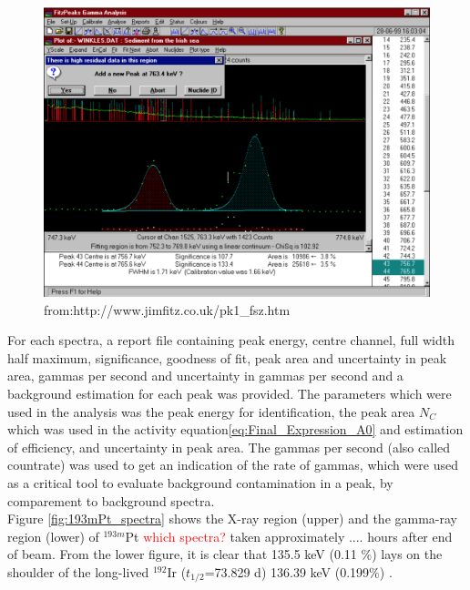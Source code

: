 \begin{figure}
    \centering
    \includegraphics[width=12cm]{Analysis/fitz_example.png}
    \caption{from:http://www.jimfitz.co.uk/pk1_fsz.htm}
    \label{fig:fitz_example}
\end{figure}

\noindent For each spectra, a report file containing peak energy, centre channel, full width half maximum, significance, goodness of fit, peak area and uncertainty in peak area, gammas per second and uncertainty in gammas per second and a background estimation for each peak was provided. The parameters which were used in the analysis was the peak energy for identification, the peak area $N_C$ which was used in the activity equation\ref{eq:Final_Expression_A0} and estimation of efficiency, and uncertainty in peak area. The gammas per second (also called countrate) was used to get an indication of the rate of gammas, which were used as a critical tool to evaluate background contamination in a peak, by comparement to background spectra.  \\ 

\noindent 
Figure \ref{fig:193mPt_spectra} shows the X-ray region (upper) and the gamma-ray region (lower) of $^{193m}$Pt \textcolor{red}{which spectra?} taken approximately .... hours after end of beam. From the lower figure, it is clear that 135.5 keV (0.11 \%) lays on the shoulder of the long-lived $^{192}$Ir ($t_{1/2}$=73.829 d) 136.39 keV (0.199\%) \cite{Baglin2012, ShamsuzzohaBasunia2017a}. 


